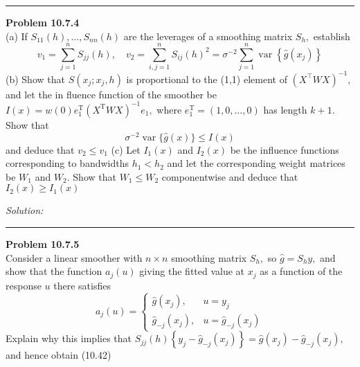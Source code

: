 \documentclass[a4paper, 11pt]{article}
\newenvironment{problem}[2][Problem]
    { \begin{mdframed}[backgroundcolor=gray!20] \textbf{#1 #2} \\}
    {  \end{mdframed}}
\newenvironment{solution}
    {\textit{Solution:}}
    {}
\begin{document}
\noindent\rule{7in}{2.8pt}

\begin{problem}{10.7.4}
 (a) If $S_{11}(h), \ldots, S_{n n}(h)$ are the leverages of a smoothing matrix $S_{h},$ establish
\[
v_{1}=\sum_{j=1}^{n} S_{j j}(h), \quad v_{2}=\sum_{i, j=1}^{n} S_{i j}(h)^{2}=\sigma^{-2} \sum_{j=1}^{n} \operatorname{var}\left\{\widehat{g}\left(x_{j}\right)\right\}
\]
(b) Show that $S\left(x_{j} ; x_{j}, h\right)$ is proportional to the (1,1) element of $\left(X^{\top} W X\right)^{-1}$, and let the in fluence function of the smoother be $I(x)=w(0) e_{1}^{\mathrm{T}}\left(X^{\mathrm{T}} W X\right)^{-1} e_{1},$ where $e_{1}^{\mathrm{T}}=(1,0, \ldots, 0)$
has length $k+1 .$ Show that
\[
\sigma^{-2} \operatorname{var}\{\widehat{g}(x)\} \leq I(x)
\]
and deduce that $v_{2} \leq v_{1}$
(c) Let $I_{1}(x)$ and $I_{2}(x)$ be the influence functions corresponding to bandwidths $h_{1}<h_{2}$ and let the corresponding weight matrices be $W_{1}$ and $W_{2}$. Show that $W_{1} \leq W_{2}$ componentwise and deduce that $I_{2}(x) \geq I_{1}(x)$
 
\end{problem}

\begin{solution}



\end{solution}

\noindent\rule{7in}{2.8pt}

\begin{problem}{10.7.5}
 
 Consider a linear smoother with $n \times n$ smoothing matrix $S_{h},$ so $\widehat{g}=S_{h} y,$ and show that the function $a_{j}(u)$ giving the fitted value at $x_{j}$ as a function of the response $u$ there satisfies
\[
a_{j}(u)=\left\{\begin{array}{ll}
\widehat{g}\left(x_{j}\right), & u=y_{j} \\
\widehat{g}_{-j}\left(x_{j}\right), & u=\widehat{g}_{-j}\left(x_{j}\right)
\end{array}\right.
\]
Explain why this implies that $S_{j j}(h)\left\{y_{j}-\widehat{g}_{-j}\left(x_{j}\right)\right\}=\widehat{g}\left(x_{j}\right)-\widehat{g}_{-j}\left(x_{j}\right),$ and hence obtain
(10.42)
 
\end{problem}
\end{document}
